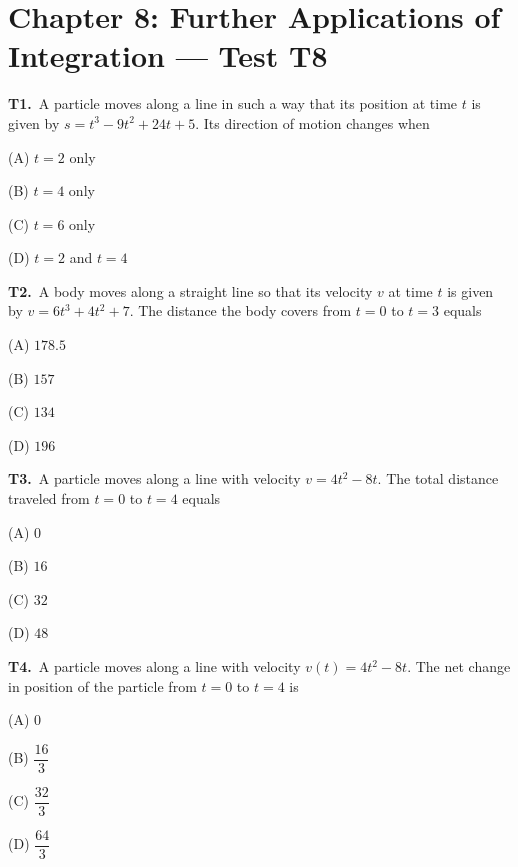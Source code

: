 \documentclass[11pt]{article}
\begin{document}
\section*{Chapter 8: Further Applications of Integration --- Test T8}

\bigskip\noindent\textbf{T1.}\ A particle moves along a line in such a way that its position at time $t$ is given by $s=t^3-9t^2+24t+5$. Its direction of motion changes when
\begin{list}{}{\setlength{\leftmargin}{3em}\setlength{\labelwidth}{2.5em}\setlength{\itemsep}{0pt}\setlength{\topsep}{2pt}}
\item[(A)] $t=2$ only
\item[(B)] $t=4$ only
\item[(C)] $t=6$ only
\item[(D)] $t=2$ and $t=4$
\end{list}

\bigskip\noindent\textbf{T2.}\ A body moves along a straight line so that its velocity $v$ at time $t$ is given by $v=6t^3+4t^2+7$. The distance the body covers from $t=0$ to $t=3$ equals
\begin{list}{}{\setlength{\leftmargin}{3em}\setlength{\labelwidth}{2.5em}\setlength{\itemsep}{0pt}\setlength{\topsep}{2pt}}
\item[(A)] $178.5$
\item[(B)] $157$
\item[(C)] $134$
\item[(D)] $196$
\end{list}

\bigskip\noindent\textbf{T3.}\ A particle moves along a line with velocity $v=4t^2-8t$. The total distance traveled from $t=0$ to $t=4$ equals
\begin{list}{}{\setlength{\leftmargin}{3em}\setlength{\labelwidth}{2.5em}\setlength{\itemsep}{0pt}\setlength{\topsep}{2pt}}
\item[(A)] $0$
\item[(B)] $16$
\item[(C)] $32$
\item[(D)] $48$
\end{list}

\bigskip\noindent\textbf{T4.}\ A particle moves along a line with velocity $v(t)=4t^2-8t$. The net change in position of the particle from $t=0$ to $t=4$ is
\begin{list}{}{\setlength{\leftmargin}{3em}\setlength{\labelwidth}{2.5em}\setlength{\itemsep}{0pt}\setlength{\topsep}{2pt}}
\item[(A)] $0$
\item[(B)] $\dfrac{16}{3}$
\item[(C)] $\dfrac{32}{3}$
\item[(D)] $\dfrac{64}{3}$
\end{list}
\end{document}

